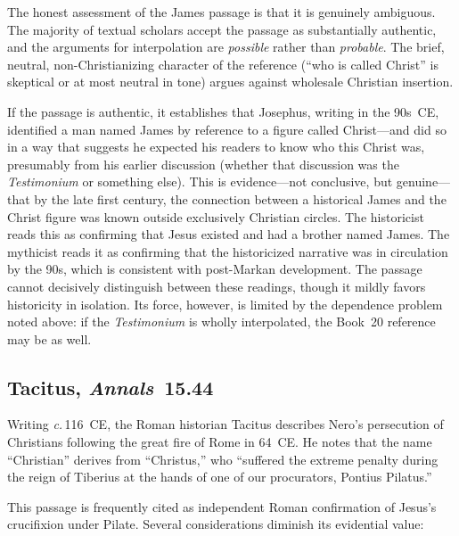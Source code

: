 \documentclass[12pt,oneside]{article}
\newcommand{\circa}{\textit{c.}\,}
\begin{document}
The honest assessment of the James passage is that it is genuinely
ambiguous.  The majority of textual scholars accept the passage as
substantially authentic, and the arguments for interpolation are
\textit{possible} rather than \textit{probable}.  The brief, neutral,
non-Christianizing character of the reference (``who is called Christ''
is skeptical or at most neutral in tone) argues against wholesale
Christian insertion.

If the passage is authentic, it establishes that Josephus, writing in
the 90s~CE, identified a man named James by reference to a figure called
Christ---and did so in a way that suggests he expected his readers to
know who this Christ was, presumably from his earlier discussion
(whether that discussion was the \textit{Testimonium} or something
else).  This is evidence---not conclusive, but genuine---that by the
late first century, the connection between a historical James and the
Christ figure was known outside exclusively Christian circles.  The
historicist reads this as confirming that Jesus existed and had a
brother named James.  The mythicist reads it as confirming that the
historicized narrative was in circulation by the 90s, which is
consistent with post-Markan development.  The passage cannot decisively
distinguish between these readings, though it mildly favors historicity
in isolation.  Its force, however, is limited by the dependence problem
noted above: if the \textit{Testimonium} is wholly interpolated, the
Book~20 reference may be as well.

\subsection{Tacitus, \textit{Annals}~15.44}
\label{sec:external:tacitus}

Writing \circa 116~CE, the Roman historian Tacitus describes Nero's
persecution of Christians following the great fire of Rome in 64~CE.
He notes that the name ``Christian'' derives from ``Christus,'' who
``suffered the extreme penalty during the reign of Tiberius at the hands
of one of our procurators, Pontius Pilatus.''

This passage is frequently cited as independent Roman confirmation of
Jesus's crucifixion under Pilate.  Several considerations diminish its
evidential value:
\end{document}
